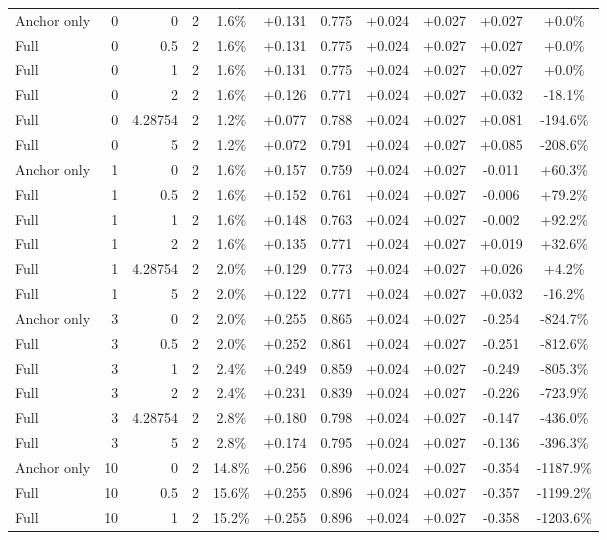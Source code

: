 \begin{table}[htbp]
\begin{tabular}{lrrrccccccc}
Anchor only & 0 & 0 & 2 & 1.6\% & +0.131 & 0.775 & +0.024 & +0.027 & +0.027 & +0.0\% \\
Full & 0 & 0.5 & 2 & 1.6\% & +0.131 & 0.775 & +0.024 & +0.027 & +0.027 & +0.0\% \\
Full & 0 & 1 & 2 & 1.6\% & +0.131 & 0.775 & +0.024 & +0.027 & +0.027 & +0.0\% \\
Full & 0 & 2 & 2 & 1.6\% & +0.126 & 0.771 & +0.024 & +0.027 & +0.032 & -18.1\% \\
Full & 0 & 4.28754 & 2 & 1.2\% & +0.077 & 0.788 & +0.024 & +0.027 & +0.081 & -194.6\% \\
Full & 0 & 5 & 2 & 1.2\% & +0.072 & 0.791 & +0.024 & +0.027 & +0.085 & -208.6\% \\
Anchor only & 1 & 0 & 2 & 1.6\% & +0.157 & 0.759 & +0.024 & +0.027 & -0.011 & +60.3\% \\
Full & 1 & 0.5 & 2 & 1.6\% & +0.152 & 0.761 & +0.024 & +0.027 & -0.006 & +79.2\% \\
Full & 1 & 1 & 2 & 1.6\% & +0.148 & 0.763 & +0.024 & +0.027 & -0.002 & +92.2\% \\
Full & 1 & 2 & 2 & 1.6\% & +0.135 & 0.771 & +0.024 & +0.027 & +0.019 & +32.6\% \\
Full & 1 & 4.28754 & 2 & 2.0\% & +0.129 & 0.773 & +0.024 & +0.027 & +0.026 & +4.2\% \\
Full & 1 & 5 & 2 & 2.0\% & +0.122 & 0.771 & +0.024 & +0.027 & +0.032 & -16.2\% \\
Anchor only & 3 & 0 & 2 & 2.0\% & +0.255 & 0.865 & +0.024 & +0.027 & -0.254 & -824.7\% \\
Full & 3 & 0.5 & 2 & 2.0\% & +0.252 & 0.861 & +0.024 & +0.027 & -0.251 & -812.6\% \\
Full & 3 & 1 & 2 & 2.4\% & +0.249 & 0.859 & +0.024 & +0.027 & -0.249 & -805.3\% \\
Full & 3 & 2 & 2 & 2.4\% & +0.231 & 0.839 & +0.024 & +0.027 & -0.226 & -723.9\% \\
Full & 3 & 4.28754 & 2 & 2.8\% & +0.180 & 0.798 & +0.024 & +0.027 & -0.147 & -436.0\% \\
Full & 3 & 5 & 2 & 2.8\% & +0.174 & 0.795 & +0.024 & +0.027 & -0.136 & -396.3\% \\
Anchor only & 10 & 0 & 2 & 14.8\% & +0.256 & 0.896 & +0.024 & +0.027 & -0.354 & -1187.9\% \\
Full & 10 & 0.5 & 2 & 15.6\% & +0.255 & 0.896 & +0.024 & +0.027 & -0.357 & -1199.2\% \\
Full & 10 & 1 & 2 & 15.2\% & +0.255 & 0.896 & +0.024 & +0.027 & -0.358 & -1203.6\% \\

\end{tabular}
\end{table}
